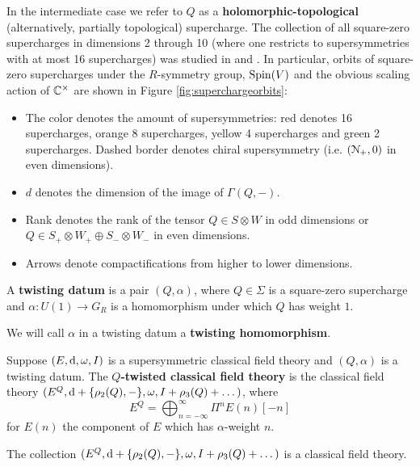 \documentclass[10pt, oneside]{article}
\begin{document}
In the intermediate case we refer to $Q$ as a {\bf holomorphic-topological} (alternatively, partially topological) supercharge. The collection of all square-zero supercharges in dimensions 2 through 10 (where one restricts to supersymmetries with at most 16 supercharges) was studied in \cite{ElliottSafronov} and \cite{EagerSaberiWalcher}. In particular, orbits of square-zero supercharges under the $R$-symmetry group, $\mathrm{Spin}(V)$ and the obvious scaling action of $\mathbb C^\times$ are shown in Figure \ref{fig:superchargeorbits}:
\begin{itemize}
\item The color denotes the amount of supersymmetries: red denotes 16 supercharges, orange 8 supercharges, yellow 4 supercharges and green 2 supercharges. Dashed border denotes chiral supersymmetry (i.e. $(\mathcal N_+, 0)$ in even dimensions).

\item $d$ denotes the dimension of the image of $\Gamma(Q, -)$.

\item Rank denotes the rank of the tensor $Q\in S\otimes W$ in odd dimensions or $Q\in S_+\otimes W_+\oplus S_-\otimes W_-$ in even dimensions.

\item Arrows denote compactifications from higher to lower dimensions.
\end{itemize}

\begin{definition}
A {\bf twisting datum} is a pair $(Q, \alpha)$, where $Q\in\Sigma$ is a square-zero supercharge and $\alpha\colon U(1)\rightarrow G_R$ is a homomorphism under which $Q$ has weight $1$.
\end{definition}

We will call $\alpha$ in a twisting datum a {\bf twisting homomorphism}.

\begin{definition}
Suppose $(E, {\rm d}, \omega, I)$ is a supersymmetric classical field theory and $(Q, \alpha)$ is a twisting datum. The {\bf $Q$-twisted classical field theory} is the classical field theory $(E^Q, {\rm d} + \{\rho_2(Q), -\}, \omega, I + \rho_3(Q) + \dots)$, where
\[E^Q = \bigoplus_{n=-\infty}^\infty \Pi^n E(n)[-n]\]
for $E(n)$ the component of $E$ which has $\alpha$-weight $n$.
\end{definition}

\begin{prop}
The collection $(E^Q, {\rm d} + \{\rho_2(Q), -\}, \omega, I + \rho_3(Q) + \dots)$ is a classical field theory.
\end{prop}
\end{document}
